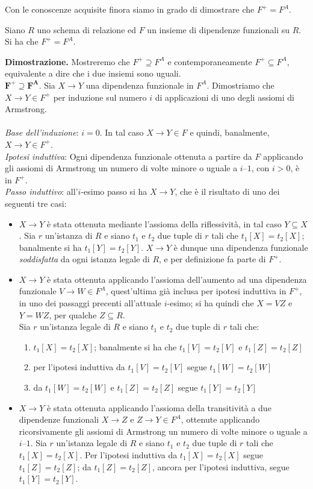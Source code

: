 Con le conoscenze acquisite finora siamo in grado di dimostrare che $F^+ = F^A$.
\label{teorema4_3}
\begin{theo}
Siano $R$ uno schema di relazione ed $F$ un insieme di dipendenze funzionali su $R$. Si ha che $F^+ = F^A$.
\end{theo}
\textbf{Dimostrazione.} Mostreremo che $F^+ \supseteq F^A$ e contemporaneamente $F^+ \subseteq F^A$, equivalente
a dire che i due insiemi sono uguali.\\
$\mathbf{F^{\boldsymbol{+}} \boldsymbol{\supseteq} F^A}$. Sia $X \rightarrow Y$ una dipendenza funzionale in $F^A$.
Dimostriamo che $X\rightarrow Y \in F^+$ per induzione sul numero $i$ di applicazioni di uno degli assiomi di Armstrong.\\\\
\emph{Base dell'induzione}: $i=0$. In tal caso $X \rightarrow Y \in F$ e quindi, banalmente, 
$X \rightarrow Y \in F^+$.\\
\emph{Ipotesi induttiva}: Ogni dipendenza funzionale ottenuta a partire da $F$ applicando gli assiomi di 
Armstrong un numero di volte minore o uguale a $i–1$, con $i>0$, è in $F^+$.\\
\emph{Passo induttivo}: all'$i$-esimo passo si ha $X \rightarrow Y$, che è il risultato di uno dei seguenti 
tre casi:
\begin{itemize}
 \item  $X \rightarrow Y$ è stata ottenuta mediante l'assioma della riflessività, in tal caso $Y \subseteq X$. 
 Sia $r$ un'istanza di $R$ e siano $t_1$ e $t_2$ due tuple di $r$ tali che $t_1[X]=t_2[X]$; banalmente si ha 
 $t_1[Y] = t_2[Y]$. $X \rightarrow Y$ è dunque una dipendenza funzionale \emph{soddisfatta} da ogni istanza legale
 di $R$, e per definizione fa parte di $F^+$.
 \item $X \rightarrow Y$ è stata ottenuta applicando l'assioma dell'aumento ad una dipendenza funzionale 
 $V \rightarrow W \in F^A$, quest'ultima già inclusa per ipotesi induttiva in $F^+$, in uno dei passaggi 
 precenti all'attuale $i$-esimo; si ha quindi che $X = VZ$ e $Y = WZ$, per qualche $Z \subseteq R$.\\
 Sia $r$ un'istanza legale di $R$ e siano $t_1$ e $t_2$ due tuple di $r$ tali che:
 \begin{enumerate}
  \item $t_1[X] = t_2[X]$; banalmente si ha che $t_1[V] = t_2[V]$ e $t_1[Z] = t_2[Z]$
  \item per l'ipotesi induttiva da $t_1[V] = t_2[V]$ segue $t_1[W] = t_2[W]$
  \item da $t_1[W] = t_2[W]$ e $t_1[Z] = t_2[Z]$ segue $t_1[Y] = t_2[Y]$
 \end{enumerate}
\item $X \rightarrow Y$ è stata ottenuta applicando l'assioma della transitività a due dipendenze funzionali 
$X \rightarrow Z$ e $Z \rightarrow Y \in F^A$, ottenute applicando ricorsivamente gli assiomi di Armstrong 
un numero di volte minore o uguale a $i–1$. Sia $r$ un'istanza legale di $R$ e siano $t_1$ e $t_2$ due tuple 
di $r$ tali che $t_1[X] = t_2[X]$. Per l'ipotesi induttiva da $t_1[X] = t_2[X]$ segue $t_1[Z] = t_2[Z]$; da 
$t_1[Z] = t_2[Z]$, ancora per l'ipotesi induttiva, segue $t_1[Y] = t_2[Y]$.
\end{itemize}
